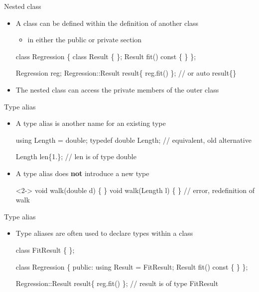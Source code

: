 \begin{frame}[fragile]{Nested class}
  \begin{itemize}

  \item A class can be defined within the definition of another class
    \begin{itemize}
    \item in either the public or private section
    \end{itemize}

    \begin{codeblock}
class Regression \{
  \ddd
  \alert{class Result \{ \ddd \};}
  Result fit() const \{ \ddd \}
\};

Regression reg;
\ddd
Regression::Result result\{ reg.fit() \}; // or auto result\{\ddd\}\end{codeblock}

  \item<2-> The nested class can access the private members of the outer class
  \end{itemize}

\end{frame}

\begin{frame}[fragile]{Type alias}

  \begin{itemize}
  \item A type alias is another name for an existing type

  \begin{codeblock}
using Length = double;
typedef double Length; // equivalent, old alternative

Length len\{1.\}; // len is of type double\end{codeblock}

  \item<2-> A type alias does \textbf{not} introduce a new type

    \begin{codeblock}<2->{
void walk(double d) \{ \ddd \}
void walk(Length l) \{ \ddd \} // error, redefinition of walk}\end{codeblock}

  \end{itemize}
\end{frame}

\begin{frame}[fragile]{Type alias \insertcontinuationtext}

  \begin{itemize}
  \item Type aliases are often used to declare types within a class

    \begin{codeblock}
class FitResult \{ \ddd \};

class Regression \{
  \ddd
 public:
  \alert{using Result = FitResult;}
  Result fit() const \{ \ddd \}
\};

Regression::Result result\{ reg.fit() \}; // result is of type FitResult\end{codeblock}

  \end{itemize}

\end{frame}

